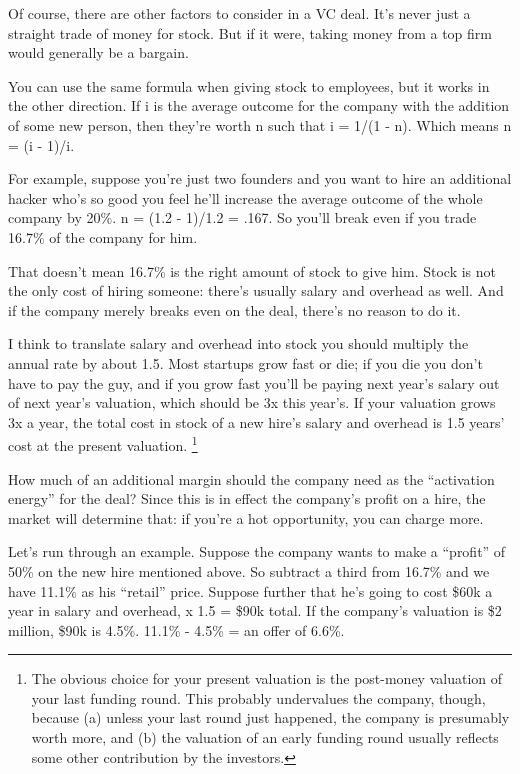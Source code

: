 \documentclass[12pt]{book}
\begin{document}
Of course, there are other factors to consider in a VC deal. It's never
just a straight trade of money for stock. But if it were, taking money
from a top firm would generally be a bargain.

You can use the same formula when giving stock to employees, but it
works in the other direction. If i is the average outcome for the
company with the addition of some new person, then they're worth n such
that i = 1/(1 - n). Which means n = (i - 1)/i.

For example, suppose you're just two founders and you want to hire an
additional hacker who's so good you feel he'll increase the average
outcome of the whole company by 20\%. n = (1.2 - 1)/1.2 = .167. So
you'll break even if you trade 16.7\% of the company for him.

That doesn't mean 16.7\% is the right amount of stock to give him. Stock
is not the only cost of hiring someone: there's usually salary and
overhead as well. And if the company merely breaks even on the deal,
there's no reason to do it.

I think to translate salary and overhead into stock you should multiply
the annual rate by about 1.5. Most startups grow fast or die; if you die
you don't have to pay the guy, and if you grow fast you'll be paying
next year's salary out of next year's valuation, which should be 3x this
year's. If your valuation grows 3x a year, the total cost in stock of a
new hire's salary and overhead is 1.5 years' cost at the present
valuation. \footnote{The obvious choice for your present valuation is the post-money
valuation of your last funding round. This probably undervalues the
company, though, because (a) unless your last round just happened, the
company is presumably worth more, and (b) the valuation of an early
funding round usually reflects some other contribution by the investors.}

How much of an additional margin should the company need as the
``activation energy'' for the deal? Since this is in effect the
company's profit on a hire, the market will determine that: if you're a
hot opportunity, you can charge more.

Let's run through an example. Suppose the company wants to make a
``profit'' of 50\% on the new hire mentioned above. So subtract a third
from 16.7\% and we have 11.1\% as his ``retail'' price. Suppose further
that he's going to cost \$60k a year in salary and overhead, x 1.5 =
\$90k total. If the company's valuation is \$2 million, \$90k is 4.5\%.
11.1\% - 4.5\% = an offer of 6.6\%.
\end{document}

